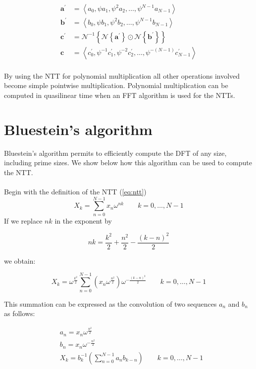 \documentclass[english,master=eelt,masteroption=ec]{kulemt}
\begin{document}
\begin{equation} 
\begin{split}
\mathbf{a}^\prime &= \left \langle a_0, \psi a_1, \psi^2 a_2, \ldots, \psi^{N-1} a_{N-1} \right \rangle \\
\mathbf{b}^\prime &= \left \langle b_0, \psi b_1, \psi^2 b_2, \ldots, \psi^{N-1} b_{N-1} \right \rangle \\
\mathbf{c}^\prime &= \mathcal{N}^{-1}\left\{\mathcal{N}\left\{ \textbf{a}^\prime \right\} \odot \mathcal{N}\left\{ \textbf{b}^\prime \right\} \right\} \\
\mathbf{c} &= \left \langle c_0^\prime, \psi^{-1} c_1^\prime, \psi^{-2} c_2^\prime, \ldots, \psi^{-\left(N-1\right)} c_{N-1}^\prime \right \rangle \\
\end{split}
\end{equation}

By using the NTT for polynomial multiplication all other operations involved become simple pointwise multiplication. Polynomial multiplication can be computed in quasilinear time when an FFT algorithm is used for the NTTs.

\section{Bluestein's algorithm}

Bluestein's algorithm permits to efficiently compute the DFT of any size, including prime sizes. \cite{1162132}
We show below how this algorithm can be used to compute the NTT.
\\\\
Begin with the definition of the NTT (\ref{eq:ntt})
\[X_k = \sum_{n=0}^{N-1} x_n \omega^{nk} \qquad k=0,\ldots,N-1\]
If we replace $nk$ in the exponent by

\begin{equation}
nk = \frac{k^2}{2}+\frac{n^2}{2}-\frac{\left(k-n\right)^2}{2}
\end{equation}

we obtain:

\begin{equation}
X_k = \omega^{\frac{k^2}{2}}\sum_{n=0}^{N-1} \left(x_n \omega^{\frac{n^2}{2}}\right) \omega^{-\frac{(k-n)^2}{2}} \qquad k=0,\ldots,N-1
\end{equation}

This summation can be expressed as the convolution of two sequences $a_n$ and $b_n$ as follows:

\begin{equation}
\begin{split}
& a_n = x_n \omega^{\frac{n^2}{2}} \\
& b_n = x_n \omega^{-\frac{n^2}{2}} \\
& X_k = b_k^{-1} \left(\sum_{n=0}^{N-1} a_n b_{k-n} \right) \qquad k=0,\ldots,N-1
\end{split}
\end{equation}
\end{document}
